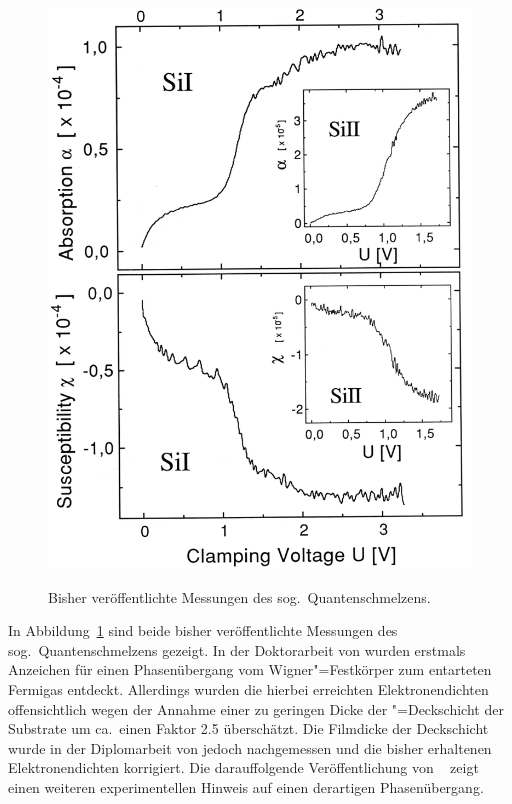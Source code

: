 \begin{figure}[h!tp]
\begin{center}
{		\includegraphics[width=\ssmallwidth]{stand_der_forschung/Gue96}}%
	\end{center}
	\caption{Bisher veröffentlichte Messungen des sog.\ Quantenschmelzens.}
	\label{fig:oldQM}
\end{figure}
In Abbildung~\ref{fig:oldQM} sind beide bisher veröffentlichte Messungen des sog.\ Quantenschmelzens gezeigt. In der Doktorarbeit von  \cite{guenzler} wurden erstmals Anzeichen für einen Phasenübergang vom Wigner"=Festkörper zum entarteten Fermigas entdeckt. Allerdings wurden die hierbei erreichten Elektronendichten offensichtlich wegen der Annahme einer zu geringen Dicke der \SiO"=Deckschicht der Substrate um ca.\ einen Faktor 2.5 überschätzt. Die Filmdicke der Deckschicht wurde in der Diplomarbeit von  \cite{bitnar} jedoch nachgemessen und die bisher erhaltenen Elektronendichten korrigiert. Die darauffolgende Veröffentlichung von  \ea\ \cite{Gue96} zeigt einen weiteren experimentellen Hinweis auf einen derartigen Phasenübergang.
 
